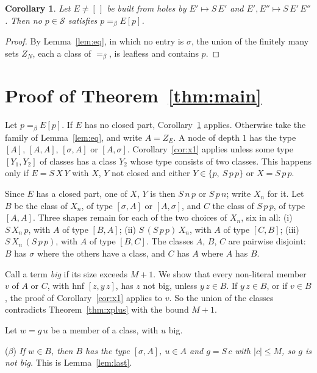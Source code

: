 \documentclass[11pt]{amsart}
\newtheorem{corollary}[theorem]{Corollary}
\newcommand{\Ter}{\mathcal S}
\newcommand{\conv}{=_\beta}
\newcommand{\sz}[1]{\lvert#1\rvert}
\newcommand{\fr}[1]{[#1]}
\begin{document}
\begin{corollary}\label{cor:holes}
Let $E\ne[\,]$ be built from holes by $E'\mapsto S\,E'$ and $E',E''\mapsto S\,E'\,E''$. Then no
$p\in\Ter$ satisfies $p\conv E[p]$.
\end{corollary}

\begin{proof}
By Lemma~\ref{lem:eq}, in which no entry is $\sigma$, the union of the finitely many sets $Z_N$, each a class of $\conv$, is
leafless and contains $p$.
\end{proof}


\section{Proof of Theorem~\ref{thm:main}}\label{sec:main}

Let $p\conv E[p]$. If $E$ has no closed part, Corollary~\ref{cor:holes} applies. Otherwise take
the family of Lemma~\ref{lem:eq}, and write $A=Z_E$. A node of depth $1$ has the type $\fr{A}$,
$\fr{A,A}$, $\fr{\sigma,A}$ or $\fr{A,\sigma}$. Corollary~\ref{cor:x1} applies unless some type
$\fr{Y_1,Y_2}$ of classes has a class $Y_2$ whose type consists of two classes. This happens only
if $E=S\,X\,Y$ with $X$, $Y$ not closed and either $Y\in\{p,\ S\,p\,p\}$ or $X=S\,p\,p$.

Since $E$ has a closed part, one of $X$, $Y$ is then $S\,n\,p$ or $S\,p\,n$; write $X_n$ for it.
Let $B$ be the class of $X_n$, of type $\fr{\sigma,A}$ or $\fr{A,\sigma}$, and $C$ the class of
$S\,p\,p$, of type $\fr{A,A}$. Three shapes remain for each of the two choices of $X_n$, six in
all: (i) $S\,X_n\,p$, with $A$ of type $\fr{B,A}$; (ii) $S\,(S\,p\,p)\,X_n$, with $A$ of type
$\fr{C,B}$; (iii) $S\,X_n\,(S\,p\,p)$, with $A$ of type $\fr{B,C}$. The classes $A$, $B$, $C$ are
pairwise disjoint: $B$ has $\sigma$ where the others have a class, and $C$ has $A$ where $A$
has $B$.

Call a term \emph{big} if its size exceeds $M+1$. We show that every non-literal member $v$ of $A$
or $C$, with hnf $\fr{z,y\,z}$, has $z$ not big, unless $y\,z\in B$. If $y\,z\in B$, or if
$v\in B$, the proof of Corollary~\ref{cor:x1} applies to $v$. So the union of the classes
contradicts Theorem~\ref{thm:xplus} with the bound $M+1$.

Let $w=g\,u$ be a member of a class, with $u$ big.

($\beta$) \emph{If $w\in B$, then $B$ has the type $\fr{\sigma,A}$, $u\in A$ and $g=S\,c$ with $\sz c\le M$, so
$g$ is not big.} This is Lemma~\ref{lem:last}.
\end{document}
